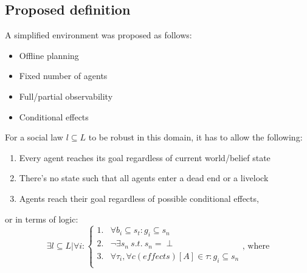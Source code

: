 \documentclass[fleqn,10pt]{olplainarticle}
\begin{document}
\subsection{Proposed definition} \label{prop-env}
A simplified environment was proposed as follows:
\begin{itemize}
    \item Offline planning
    \item Fixed number of agents
    \item Full/partial observability
    \item Conditional effects
\end{itemize}

For a social law $l \subseteq L$ to be robust in this domain, it has to allow the following:
\begin{enumerate}
    \item Every agent reaches its goal regardless of current world/belief state
    \item There's no state such that all agents enter a dead end or a livelock
    \item Agents reach their goal regardless of possible conditional effects,
\end{enumerate}
or in terms of logic:
\begin{equation}
    \exists l \subseteq L \vert \forall i:
    \begin{cases}      
        1. &\forall b_i \subseteq s_t : g_i \subseteq s_n  \\
        2. &\neg \exists s_n \ s.t.\ s_n = \perp \\
        3. &\forall \tau_i, \forall c(effects)[A] \in \tau: g_i \subseteq s_n \\
    \end{cases} 
    \text{, where}
\end{equation}
\end{document}
